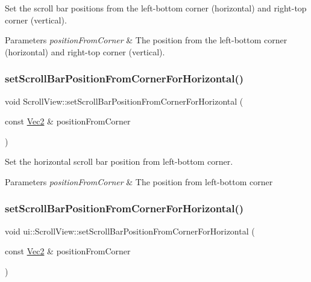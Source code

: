 Set the scroll bar positions from the left-\/bottom corner (horizontal) and right-\/top corner (vertical). 


\begin{DoxyParams}{Parameters}
{\em position\+From\+Corner} & The position from the left-\/bottom corner (horizontal) and right-\/top corner (vertical). \\
\hline
\end{DoxyParams}
\mbox{\label{classui_1_1ScrollView_a90be948f12e37abc74892a7446aabb1a}} 
\subsubsection{\texorpdfstring{set\+Scroll\+Bar\+Position\+From\+Corner\+For\+Horizontal()}{setScrollBarPositionFromCornerForHorizontal()}\hspace{0.1cm}{\footnotesize\ttfamily [1/2]}}
{\footnotesize\ttfamily void Scroll\+View\+::set\+Scroll\+Bar\+Position\+From\+Corner\+For\+Horizontal (\begin{DoxyParamCaption}\item[{const \hyperlink{classVec2}{Vec2} \&}]{position\+From\+Corner }\end{DoxyParamCaption})}



Set the horizontal scroll bar position from left-\/bottom corner. 


\begin{DoxyParams}{Parameters}
{\em position\+From\+Corner} & The position from left-\/bottom corner \\
\hline
\end{DoxyParams}
\mbox{\label{classui_1_1ScrollView_a8397f63974607826080a8b89ff640915}} 
\subsubsection{\texorpdfstring{set\+Scroll\+Bar\+Position\+From\+Corner\+For\+Horizontal()}{setScrollBarPositionFromCornerForHorizontal()}\hspace{0.1cm}{\footnotesize\ttfamily [2/2]}}
{\footnotesize\ttfamily void ui\+::\+Scroll\+View\+::set\+Scroll\+Bar\+Position\+From\+Corner\+For\+Horizontal (\begin{DoxyParamCaption}\item[{const \hyperlink{classVec2}{Vec2} \&}]{position\+From\+Corner }\end{DoxyParamCaption})}



